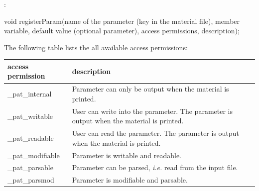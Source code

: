 :
\begin{cpp}
void registerParam(name of the parameter (key in the material file),
                   member variable,
                   default value (optional parameter),
                   access permissions,
                   description);
\end{cpp}
The following table lists the all available access permissions:
\begin{center}
  \begin{tabular}{ll}
    \toprule
    access permission & description\\
    \midrule
    \_pat\_internal & Parameter can only be output when the material is printed.\\
    \_pat\_writable & User can write into the parameter. The parameter is output when the material is printed.\\
    \_pat\_readable & User can read the parameter. \newline The parameter is output when the material is printed.\\
    \_pat\_modifiable & Parameter is writable and readable.\\
    \_pat\_parsable & Parameter can be parsed, \textit{i.e.} read from the input file.\\
    \_pat\_parsmod & Parameter is modifiable and parsable.\\
    \bottomrule
  \end{tabular}
\end{center}

